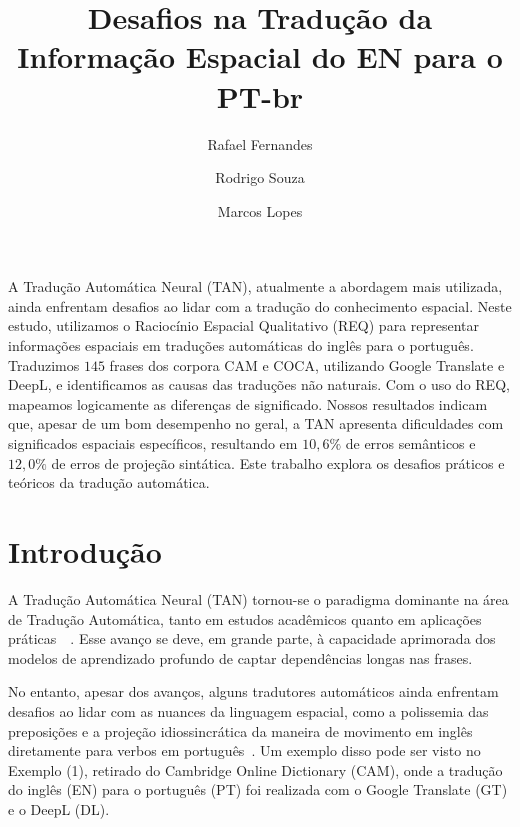 \documentclass[a4paper, twocolumn, 11pt, twoside]{article}
\title{Desafios na Tradução da Informação Espacial do EN para o PT-br}
\author{
  Rafael Fernandes
  \instituto{Universidade de São Paulo}
  \email{rafael.macario@usp.br} 
  \and 
  Rodrigo Souza
 \instituto{Universidade de São Paulo}
  \email{rodrigo.aparecido.souza@usp.br}
  \and
  Marcos Lopes
  \instituto{Universidade de São Paulo}
  \email{marcoslopes@usp.br}
  \and
}
\begin{document}
\maketitle

\begin{resumo}
  A Tradução Automática Neural (TAN), atualmente a abordagem mais utilizada, ainda enfrentam desafios ao lidar com a tradução do conhecimento espacial. Neste estudo, utilizamos o Raciocínio Espacial Qualitativo (REQ) para representar informações espaciais em traduções automáticas do inglês para o português. Traduzimos $145$ frases dos corpora CAM e COCA, utilizando Google Translate e DeepL, e identificamos as causas das traduções não naturais. Com o uso do REQ, mapeamos logicamente as diferenças de significado. Nossos resultados indicam que, apesar de um bom desempenho no geral, a TAN apresenta dificuldades com significados espaciais específicos, resultando em $10,6\%$ de erros semânticos e $12,0\%$ de erros de projeção sintática. Este trabalho explora os desafios práticos e teóricos da tradução automática.
\end{resumo}



\begin{abstract}
\end{abstract}



\section{Introdução}
A Tradução Automática Neural (TAN) tornou-se o paradigma dominante na área de Tradução Automática, tanto em estudos acadêmicos quanto em aplicações práticas~\citep{dabre2020survey}~\citep{vaswani2017attention, yang2020survey}. Esse avanço se deve, em grande parte, à capacidade aprimorada dos modelos de aprendizado profundo de captar dependências longas nas frases.

No entanto, apesar dos avanços, alguns tradutores automáticos ainda enfrentam desafios ao lidar com as nuances da linguagem espacial, como a polissemia das preposições e a projeção idiossincrática da maneira de movimento em inglês diretamente para verbos em português~\citep{}. Um exemplo disso pode ser visto no Exemplo (1), retirado do Cambridge Online Dictionary (CAM), onde a tradução do inglês (EN) para o português (PT) foi realizada com o Google Translate (GT) e o DeepL (DL).
\end{document}

